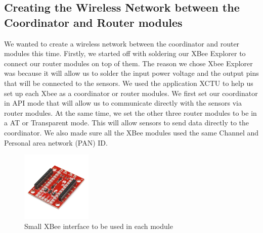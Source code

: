 	\subsection{Creating the Wireless Network between the Coordinator and Router modules}
	\par We wanted to create a wireless network between the coordinator and router modules this time. Firstly, we started off with soldering our XBee Explorer to connect our router modules on top of them. The reason we chose Xbee Explorer was because it will allow us to solder the input power voltage and the output pins that will be connected to the sensors. We used the application XCTU to help us set up each Xbee as a coordinator or router modules. We first set our coordinator in API mode that will allow us to communicate directly with the sensors via router modules. At the same time, we set the other three router modules to be in a AT or Transparent mode. This will allow sensors to send data directly to the coordinator. We also made sure all the XBee modules used the same Channel and Personal area network (PAN) ID. 
	\begin{figure}[h]
		\centering
		\includegraphics[width = 0.3\textwidth]{xbeeMiniExplorer.png}
		\caption{Small XBee interface to be used in each module}
	\end{figure}
